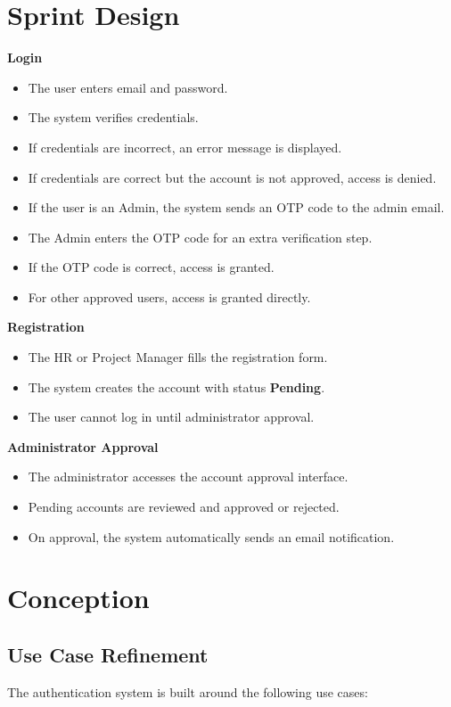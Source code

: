 \section{Sprint Design}
\textbf{Login}
\begin{itemize}[noitemsep]
	\item The user enters email and password.
	\item The system verifies credentials.
	\item If credentials are incorrect, an error message is displayed.
	\item If credentials are correct but the account is not approved, access is denied.
	\item If the user is an Admin, the system sends an OTP code to the admin email.
	\item The Admin enters the OTP code for an extra verification step.
	\item If the OTP code is correct, access is granted.
	\item For other approved users, access is granted directly.
\end{itemize}

\textbf{Registration}
\begin{itemize}[noitemsep]
	\item The HR or Project Manager fills the registration form.
	\item The system creates the account with status \textbf{Pending}.
	\item The user cannot log in until administrator approval.
\end{itemize}

\textbf{Administrator Approval}
\begin{itemize}[noitemsep]
	\item The administrator accesses the account approval interface.
	\item Pending accounts are reviewed and approved or rejected.
	\item On approval, the system automatically sends an email notification.
\end{itemize}

\section{Conception}
\subsection{Use Case Refinement}
The authentication system is built around the following use cases:

